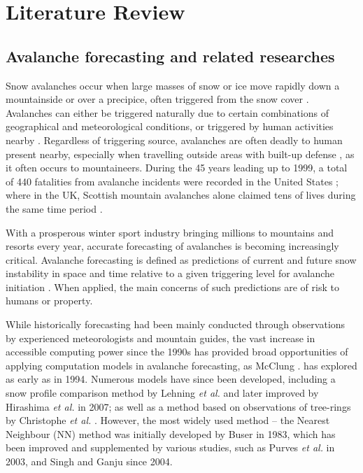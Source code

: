 \documentclass[openany]{UoYCSproject}
\begin{document}
\chapter{Literature Review} \label{ch:lit-review}

\section{Avalanche forecasting and related researches}

Snow avalanches occur when large masses of snow or ice move rapidly down a mountainside or over a precipice, often triggered from the snow cover \cite[p. 1]{91097820150101}. Avalanches can either be triggered naturally due to certain combinations of geographical \cite[p. 17]{91097820150101} and meteorological \cite[p. 23]{91097820150101} conditions, or triggered by human activities nearby \cite{schweizer2001characteristics}. Regardless of triggering source, avalanches are often deadly to human present nearby, especially when travelling outside areas with built-up defense \cite{91097820150101}, as it often occurs to mountaineers. During the 45 years leading up to 1999, a total of 440 fatalities from avalanche incidents were recorded in the United States \cite{PAGE1999146}; where in the UK, Scottish mountain avalanches alone claimed tens of lives during the same time period \cite{scottish-avalanches}.

With a prosperous winter sport industry bringing millions to mountains and resorts every year\cite{hudson2003sport}, accurate forecasting of avalanches is becoming increasingly critical. Avalanche forecasting is defined as predictions of current and future snow instability in space and time relative to a given triggering level for avalanche initiation \cite[p. 131]{McClung2002}. When applied, the main concerns of such predictions are of risk to humans or property. 

While historically forecasting had been mainly conducted through observations by experienced meteorologists and mountain guides, the vast increase in accessible computing power since the 1990s has provided broad opportunities of applying computation models in avalanche forecasting, as McClung \cite{McClung1994}. has explored as early as in 1994. Numerous models have since been developed, including a snow profile comparison method by Lehning \textit{et al.} \cite{Lehning2001253} and later improved by Hirashima \textit{et al.} in 2007; as well as a method based on observations of tree-rings by Christophe \textit{et al.} \cite{Christophe2010107}. However, the most widely used method -- the Nearest Neighbour (NN) method was initially developed by Buser \cite{buser1983avalanche} in 1983, which has been improved and supplemented by various studies, such as Purves \textit{et al.} in 2003, and Singh and Ganju \cite{Singh2004105} \cite{Singh201533} since 2004.
\end{document}
